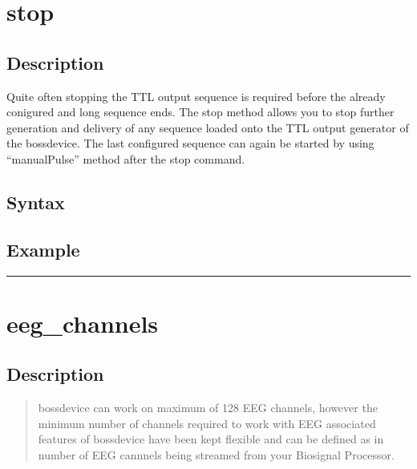 \documentclass[letterpaper,10pt,english]{sphinxmanual}
\begin{document}
\section{stop}
\label{\detokenize{4_api_documentation:stop}}

\subsection{Description}
\label{\detokenize{4_api_documentation:id10}}
\sphinxAtStartPar
Quite often stopping the TTL output sequence is required before the already conigured and long sequence ends. The stop method allows you to stop further generation and delivery of any sequence loaded onto the TTL output generator of the bossdevice.
The last configured sequence can again be started by using “manualPulse” method after the stop command.


\subsection{Syntax}
\label{\detokenize{4_api_documentation:id11}}
\begin{sphinxVerbatim}[commandchars=\\\{\}]
\end{sphinxVerbatim}


\subsection{Example}
\label{\detokenize{4_api_documentation:id12}}
\begin{sphinxVerbatim}[commandchars=\\\{\}]
\end{sphinxVerbatim}


\bigskip\hrule\bigskip



\section{eeg\_channels}
\label{\detokenize{4_api_documentation:eeg-channels}}

\subsection{Description}
\label{\detokenize{4_api_documentation:id13}}\begin{quote}

\sphinxAtStartPar
bossdevice can work on maximum of 128 EEG channels, however the minimum number of channels required to work with EEG associated features of bossdevice have been kept flexible and can be defined as in number of EEG cannnels being streamed from your Biosignal Processor.
\end{quote}
\end{document}
